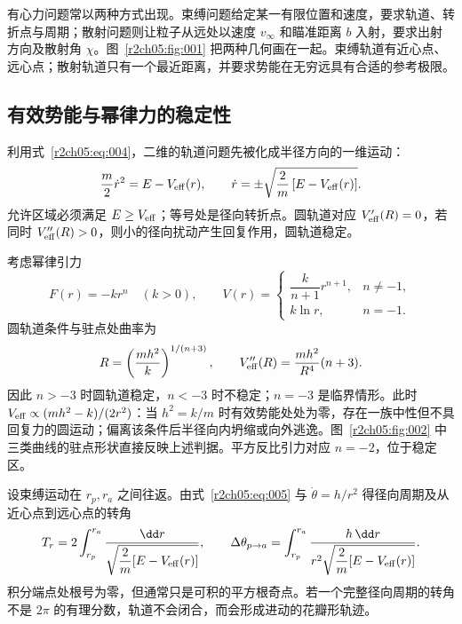 有心力问题常以两种方式出现。束缚问题给定某一有限位置和速度，要求轨道、转折点与周期；散射问题则让粒子从远处以速度 $v_\infty$ 和瞄准距离 $b$ 入射，要求出射方向及散射角 $\chi$。图~\ref{r2ch05:fig:001} 把两种几何画在一起。束缚轨道有近心点、远心点；散射轨道只有一个最近距离，并要求势能在无穷远具有合适的参考极限。
\figCentralStates

\subsection{有效势能与幂律力的稳定性}
\label{r2ch05:sec:effective}

利用式~\eqref{r2ch05:eq:004}，二维的轨道问题先被化成半径方向的一维运动：
\begin{equation}
 \frac m2\dot r^2=E-V_{\rm eff}(r),\qquad
 \dot r=\pm\sqrt{\frac{2}{m}\,[E-V_{\rm eff}(r)]}.
 \label{r2ch05:eq:005}
\end{equation}
允许区域必须满足 $E\ge V_{\rm eff}$；等号处是径向转折点。圆轨道对应 $V'_{\rm eff}(R)=0$，若同时 $V''_{\rm eff}(R)>0$，则小的径向扰动产生回复作用，圆轨道稳定。

考虑幂律引力
\begin{equation}
 F(r)=-kr^n\quad(k>0),\qquad
 V(r)=\begin{cases}
 \dfrac{k}{n+1}r^{n+1},&n\ne-1,\\[1mm]
 k\ln r,&n=-1.
 \end{cases}
 \label{r2ch05:eq:006}
\end{equation}
圆轨道条件与驻点处曲率为
\begin{equation}
 R=\left(\frac{mh^2}{k}\right)^{1/(n+3)},\qquad
 V''_{\rm eff}(R)=\frac{mh^2}{R^4}(n+3).
 \label{r2ch05:eq:007}
\end{equation}
因此 $n>-3$ 时圆轨道稳定，$n<-3$ 时不稳定；$n=-3$ 是临界情形。此时 $V_{\rm eff}\propto(mh^2-k)/(2r^2)$：当 $h^2=k/m$ 时有效势能处处为零，存在一族中性但不具回复力的圆运动；偏离该条件后半径向内坍缩或向外逃逸。图~\ref{r2ch05:fig:002} 中三类曲线的驻点形状直接反映上述判据。平方反比引力对应 $n=-2$，位于稳定区。
\figPowerLawEffective

设束缚运动在 $r_p,r_a$ 之间往返。由式~\eqref{r2ch05:eq:005} 与 $\dot\theta=h/r^2$ 得径向周期及从近心点到远心点的转角
\begin{equation}
 T_r=2\int_{r_p}^{r_a}\frac{\dd r}
 {\sqrt{\dfrac{2}{m}[E-V_{\rm eff}(r)]}},\qquad
 \Delta\theta_{p\to a}=\int_{r_p}^{r_a}
 \frac{h\,\dd r}{r^2\sqrt{\dfrac{2}{m}[E-V_{\rm eff}(r)]}}.
 \label{r2ch05:eq:008}
\end{equation}
积分端点处根号为零，但通常只是可积的平方根奇点。若一个完整径向周期的转角不是 $2\pi$ 的有理分数，轨道不会闭合，而会形成进动的花瓣形轨迹。

